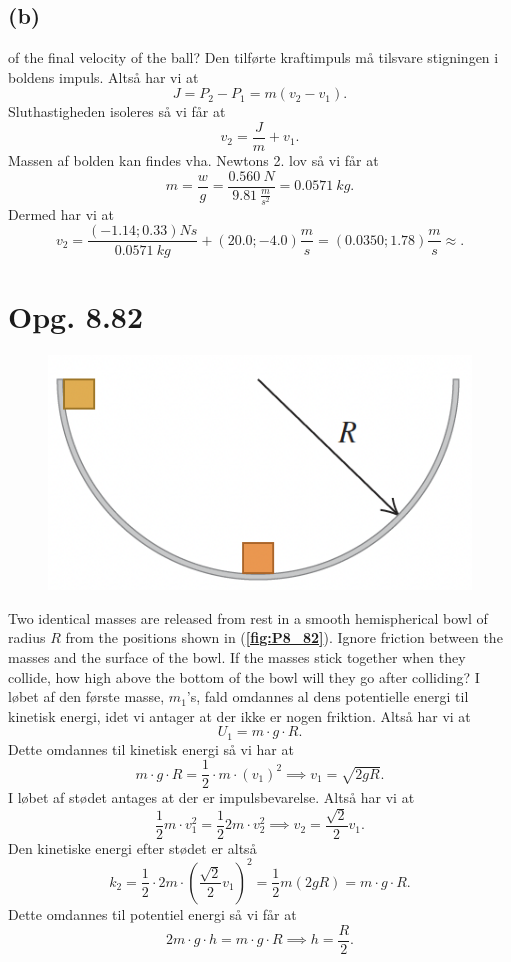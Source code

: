 \documentclass[12pt]{article}
\begin{document}
\subsection*{(b)}
of the final velocity of the ball?
\bigbreak
Den tilførte kraftimpuls må tilsvare stigningen i boldens impuls. Altså har vi at
\[
J = P_2 - P_1 = m(v_2 - v_1)
.\] 
Sluthastigheden isoleres så vi får at
\[
v_2 = \frac{J}{m} + v_1
.\] 
Massen af bolden kan findes vha. Newtons 2. lov så vi får at
\[
m = \frac{w}{g} = \frac{\qty{0,560}{N}}{\qty{9,81}{\frac{m}{s^2}}} = \qty{0,0571}{kg}
.\]
Dermed har vi at
\[
  v_2 = \frac{\left( \num{-1,14}; \num{0,33} \right) \unit{Ns}}{\qty{0,0571}{kg}} + \left( \num{20,0}; \num{-4,0} \right)\unit{\frac{m}{s}} = \left( \num{0,0350}; \num{1,78} \right)\unit{\frac{m}{s}} \approx   
.\] 


\section*{Opg. 8.82}

\begin{figure} [ht]
  \centering
  \caption{}
  \includegraphics[width=0.5\linewidth]{../figures/P8_82.png}
  \label{fig:P8_82}
\end{figure}

Two identical masses are released from rest in a smooth hemispherical bowl of radius $R$ from the positions shown in (\textbf{\autoref{fig:P8_82}}). Ignore friction between the masses and the surface of the bowl. If the masses stick together when they collide, how high above the bottom of the bowl will they go after colliding?
\bigbreak
I løbet af den første masse, $m_1$'s, fald omdannes al dens potentielle energi til kinetisk energi, idet vi antager at der ikke er nogen friktion. Altså har vi at
 \[
U_{1} = m\cdot g\cdot R
.\] 
Dette omdannes til kinetisk energi så vi har at
\[
m\cdot g\cdot R = \frac{1}{2} \cdot m \cdot \left( v_1 \right)^2  \implies v_1 = \sqrt{2gR} 
.\]
I løbet af stødet antages at der er impulsbevarelse. Altså har vi at
\[
\frac{1}{2} m\cdot v_1^2 = \frac{1}{2} 2m\cdot v_2^2 \implies v_2 = \frac{\sqrt{2}}{2} v_1
.\] 
Den kinetiske energi efter stødet er altså
\[
k_2 = \frac{1}{2} \cdot 2m \cdot \left( \frac{\sqrt{2}}{2} v_1 \right)^2 = \frac{1}{2}m\left( 2gR \right) = m\cdot g\cdot R
.\]
Dette omdannes til potentiel energi så vi får at
\[
  2m\cdot g\cdot h = m \cdot g\cdot R\implies h = \frac{R}{2}
.\] 
\end{document}
